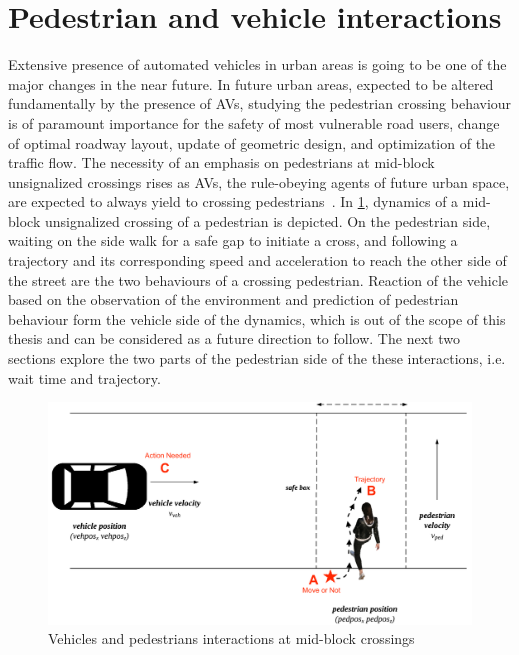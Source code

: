 \section{Pedestrian and vehicle interactions}
\label{chap1b:sec2}
Extensive presence of automated vehicles in urban areas is going to be one of the major changes in the near future. In future urban areas, expected to be altered fundamentally by the presence of AVs, studying the pedestrian crossing behaviour is of paramount importance for the safety of most vulnerable road users, change of optimal roadway layout, update of geometric design, and optimization of the traffic flow. The necessity of an emphasis on pedestrians at mid-block unsignalized crossings rises as AVs, the rule-obeying agents of future urban space, are expected to always yield to crossing pedestrians~\cite{millard2018pedestrians}. In \cref{fig:frameworkcross}, dynamics of a mid-block unsignalized crossing of a pedestrian is depicted. On the pedestrian side, waiting on the side walk for a safe gap to initiate a cross, and following a trajectory and its corresponding speed and acceleration to reach the other side of the street are the two behaviours of a crossing pedestrian. Reaction of the vehicle based on the observation of the environment and prediction of pedestrian behaviour form the vehicle side of the dynamics, which is out of the scope of this thesis and can be considered as a future direction to follow. The next two sections explore the two parts of the pedestrian side of the these interactions, i.e. wait time and trajectory.
\begin{figure}
    \centering
    \includegraphics[scale=0.2]{chapter_1b/figures/ped5.png}
    \caption{Vehicles and pedestrians interactions at mid-block crossings}
    \label{fig:frameworkcross}
\end{figure}

